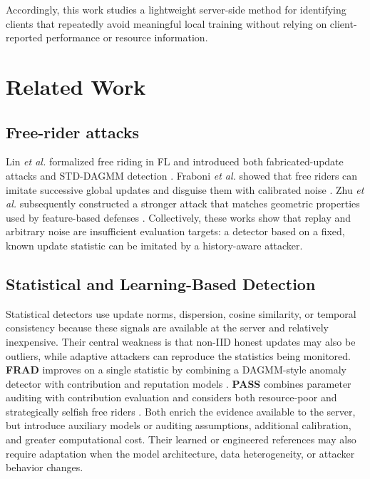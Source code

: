 \documentclass[conference]{IEEEtran}
\begin{document}
Accordingly, this work studies a lightweight server-side method for identifying clients that repeatedly avoid meaningful local training without relying on client-reported performance or resource information.


\section{Related Work}
\subsection{Free-rider attacks}
Lin \emph{et al.} formalized free riding in FL and introduced both fabricated-update attacks and STD-DAGMM detection \cite{lin2019freeriders}. Fraboni \emph{et al.} showed that free riders can imitate successive global updates and disguise them with calibrated noise \cite{fraboni2021freerider}. Zhu \emph{et al.} subsequently constructed a stronger attack that matches geometric properties used by feature-based defenses \cite{zhu2023advanced}. Collectively, these works show that replay and arbitrary noise are insufficient evaluation targets: a detector based on a fixed, known update statistic can be imitated by a history-aware attacker.

\subsection{Statistical and Learning-Based Detection}
Statistical detectors use update norms, dispersion, cosine similarity, or temporal consistency because these signals are available at the server and relatively inexpensive. Their central weakness is that non-IID honest updates may also be outliers, while adaptive attackers can reproduce the statistics being monitored. \textbf{FRAD} improves on a single statistic by combining a DAGMM-style anomaly detector with contribution and reputation models \cite{wang2024frad}. \textbf{PASS} combines parameter auditing with contribution evaluation and considers both resource-poor and strategically selfish free riders \cite{wang2023pass}. Both enrich the evidence available to the server, but introduce auxiliary models or auditing assumptions, additional calibration, and greater computational cost. Their learned or engineered references may also require adaptation when the model architecture, data heterogeneity, or attacker behavior changes.
\end{document}
